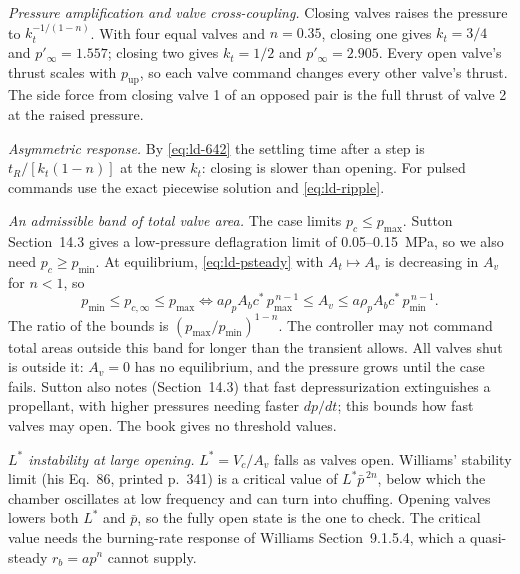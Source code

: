 \emph{Pressure amplification and valve cross-coupling.} Closing
valves raises the pressure to $k_t^{-1/(1-n)}$. With four equal valves
and $n=0.35$, closing one gives $k_t=3/4$ and $p'_\infty=1.557$;
closing two gives $k_t=1/2$ and $p'_\infty=2.905$. Every open valve's
thrust scales with $p_{\mathrm{up}}$, so each valve command changes
every other valve's thrust. The side force from closing valve 1 of an
opposed pair is the full thrust of valve 2 at the raised pressure.

\emph{Asymmetric response.} By \eqref{eq:ld-642} the settling time
after a step is $t_R/[k_t(1-n)]$ at the new $k_t$: closing is slower
than opening. For pulsed commands use the exact piecewise solution and
\eqref{eq:ld-ripple}.

\emph{An admissible band of total valve area.} The case limits
$p_c\le p_{\max}$. Sutton Section~14.3 gives a low-pressure
deflagration limit of 0.05--0.15~MPa, so we also need
$p_c\ge p_{\min}$. At equilibrium, \eqref{eq:ld-psteady} with
$A_t\mapsto A_v$ is decreasing in $A_v$ for $n<1$, so
\[
 p_{\min}\le p_{c,\infty}\le p_{\max}
 \iff
 a\rho_pA_bc^*\,p_{\max}^{\,n-1}\le A_v\le
 a\rho_pA_bc^*\,p_{\min}^{\,n-1}.
\]
The ratio of the bounds is $(p_{\max}/p_{\min})^{1-n}$. The
controller may not command total areas outside this band for longer
than the transient allows. All valves shut is outside it: $A_v=0$ has
no equilibrium, and the pressure grows until the case fails. Sutton
also notes (Section~14.3) that fast depressurization extinguishes a
propellant, with higher pressures needing faster $dp/dt$; this bounds
how fast valves may open. The book gives no threshold values.

\emph{$L^*$ instability at large opening.} $L^*=V_c/A_v$ falls as
valves open. Williams' stability limit (his Eq.~86, printed p.~341)
is a critical value of $L^*\bar p^{\,2n}$, below which the chamber
oscillates at low frequency and can turn into chuffing. Opening
valves lowers both $L^*$ and $\bar p$, so the fully open state is the
one to check. The critical value needs the burning-rate response of
Williams Section~9.1.5.4, which a quasi-steady $r_b=ap^n$ cannot supply.

